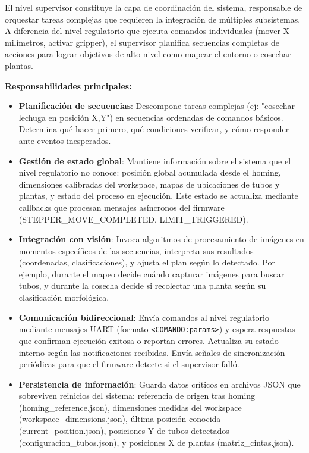 El nivel supervisor constituye la capa de coordinación del sistema, responsable de orquestar tareas complejas que requieren la integración de múltiples subsistemas. A diferencia del nivel regulatorio que ejecuta comandos individuales (mover X milímetros, activar gripper), el supervisor planifica secuencias completas de acciones para lograr objetivos de alto nivel como mapear el entorno o cosechar plantas.

\textbf{Responsabilidades principales:}

\begin{itemize}[label=$\bullet$]
    \item \textbf{Planificación de secuencias}: Descompone tareas complejas (ej: "cosechar lechuga en posición X,Y") en secuencias ordenadas de comandos básicos. Determina qué hacer primero, qué condiciones verificar, y cómo responder ante eventos inesperados.

    \item \textbf{Gestión de estado global}: Mantiene información sobre el sistema que el nivel regulatorio no conoce: posición global acumulada desde el homing, dimensiones calibradas del workspace, mapas de ubicaciones de tubos y plantas, y estado del proceso en ejecución. Este estado se actualiza mediante callbacks que procesan mensajes asíncronos del firmware (STEPPER\_MOVE\_COMPLETED, LIMIT\_TRIGGERED).

    \item \textbf{Integración con visión}: Invoca algoritmos de procesamiento de imágenes en momentos específicos de las secuencias, interpreta sus resultados (coordenadas, clasificaciones), y ajusta el plan según lo detectado. Por ejemplo, durante el mapeo decide cuándo capturar imágenes para buscar tubos, y durante la cosecha decide si recolectar una planta según su clasificación morfológica.

    \item \textbf{Comunicación bidireccional}: Envía comandos al nivel regulatorio mediante mensajes UART (formato \texttt{<COMANDO:params>}) y espera respuestas que confirman ejecución exitosa o reportan errores. Actualiza su estado interno según las notificaciones recibidas. Envía señales de sincronización periódicas para que el firmware detecte si el supervisor falló.

    \item \textbf{Persistencia de información}: Guarda datos críticos en archivos JSON que sobreviven reinicios del sistema: referencia de origen tras homing (homing\_reference.json), dimensiones medidas del workspace (workspace\_dimensions.json), última posición conocida (current\_position.json), posiciones Y de tubos detectados (configuracion\_tubos.json), y posiciones X de plantas (matriz\_cintas.json).
\end{itemize}

